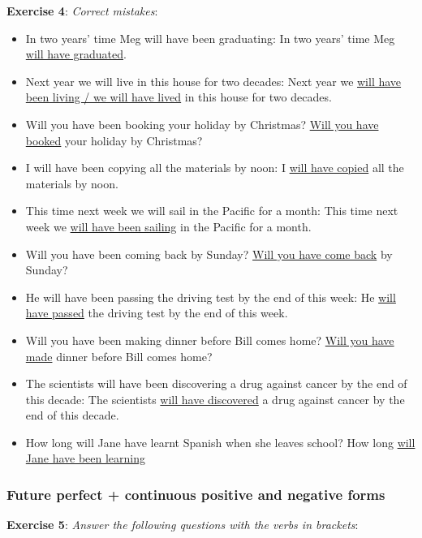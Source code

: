 \textbf{Exercise 4}: \textit{Correct mistakes}:

\begin{itemize}

\item In two years' time Meg will have been graduating: \newline In two years' time Meg \underline{will have graduated}.
\item Next year we will live in this house for two decades: \newline Next year we \underline{will have been living / we will have lived} in this house for two decades.
\item Will you have been booking your holiday by Christmas? \underline{Will you have booked} your holiday by Christmas?
\item I will have been copying all the materials by noon: I \underline{will have copied} all the materials by noon.
\item This time next week we will sail in the Pacific for a month: This time next week we \underline{will have been sailing} in the Pacific for a month.
\item Will you have been coming back by Sunday? \underline{Will you have come back} by Sunday?
\item He will have been passing the driving test by the end of this week: He \underline{will have passed}  the driving test by the end of this week.
\item Will you have been making dinner before Bill comes home? \underline{Will you have made} dinner before Bill comes home?
\item The scientists will have been discovering a drug against cancer by the end of this decade: The scientists \underline{will have discovered} a drug against cancer by the end of this decade.
\item How long will Jane have learnt Spanish when she leaves school? \newline How long \underline{will Jane have been learning} 

\end{itemize}

\subsubsection{Future perfect + continuous positive and negative forms}

\textbf{Exercise 5}: \textit{Answer the following questions with the verbs in brackets}:

